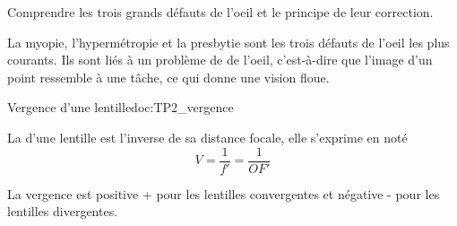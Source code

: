 \tetePremStssVisi



\begin{objectifs}
  \item Comprendre les trois grands défauts de l'oeil et le principe de leur correction.
\end{objectifs}

\begin{contexte}
  La myopie, l'hypermétropie et la presbytie sont les trois défauts de l'oeil les plus courants.
  Ils sont liés à un problème de  de l'oeil, c'est-à-dire que l'image d'un point ressemble à une tâche, ce qui donne une vision floue.
  
\end{contexte}


\begin{doc}{Vergence d'une lentille}{doc:TP2_vergence}
  \begin{encart}
    La  d'une lentille est l'inverse de sa distance focale, elle s'exprime en  noté \unit{\dioptre}
    \begin{equation*}  
      V = \dfrac{1}{f'} = \dfrac{1}{OF'}
    \end{equation*}
  \end{encart}

  La vergence est positive + pour les lentilles convergentes et négative - pour les lentilles divergentes.
\end{doc}

